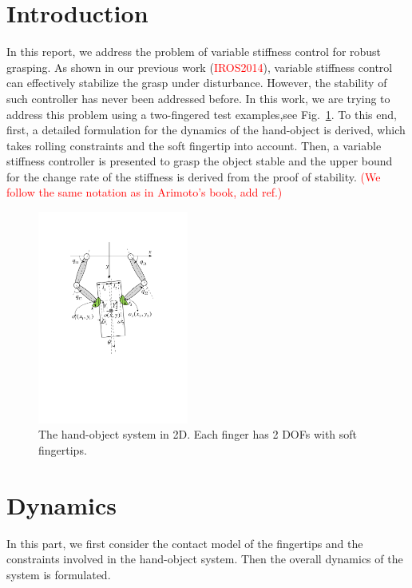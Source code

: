 \documentclass[]{article}
\title{}
\author{Miao Li}
\begin{document}
\maketitle

\begin{abstract}
\end{abstract}

\section{Introduction}
In this report, we address the problem of variable stiffness control for robust grasping. As shown in our previous work (\textcolor{red}{IROS2014}), variable stiffness control can effectively stabilize the grasp under disturbance. However, the stability of such controller has never been addressed before. In this work, we are trying to address this problem using a two-fingered test examples,see Fig.~\ref{fig::system}.
To this end, first, a detailed formulation for the dynamics of the hand-object is derived, which takes rolling constraints and the soft fingertip into account. Then, a variable stiffness controller is presented to grasp the object stable and the upper bound for the change rate of the stiffness is derived from the proof of stability.
\textcolor{red}{(We follow the same notation as in Arimoto's book, add ref.)}
\begin{figure}[h!]
\centering
\includegraphics[height=7cm]{hand_object_system.pdf}
\caption{The hand-object system in 2D. Each finger has 2 DOFs with soft fingertips.}
\label{fig::system}
\end{figure}

\section{Dynamics}
In this part, we first consider the contact model of the fingertips and the constraints involved in the hand-object system. Then the overall dynamics of the system is formulated. 
\end{document}
